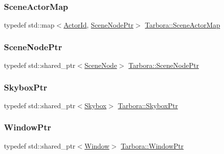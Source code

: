 \mbox{\label{namespaceTarbora_ae56af1ecaca4452fbf915c3c23354a9b}} 
\subsubsection{\texorpdfstring{Scene\+Actor\+Map}{SceneActorMap}}
{\footnotesize\ttfamily typedef std\+::map$<$\hyperlink{Global_8hpp_a2e71a876c4eb419c50f28a6c25a68ad2}{Actor\+Id}, \hyperlink{namespaceTarbora_a327c3a2ca2a7015a49e2cf0b926c47f1}{Scene\+Node\+Ptr}$>$ \hyperlink{namespaceTarbora_ae56af1ecaca4452fbf915c3c23354a9b}{Tarbora\+::\+Scene\+Actor\+Map}}

\mbox{\label{namespaceTarbora_a327c3a2ca2a7015a49e2cf0b926c47f1}} 
\subsubsection{\texorpdfstring{Scene\+Node\+Ptr}{SceneNodePtr}}
{\footnotesize\ttfamily typedef std\+::shared\+\_\+ptr$<$\hyperlink{classTarbora_1_1SceneNode}{Scene\+Node}$>$ \hyperlink{namespaceTarbora_a327c3a2ca2a7015a49e2cf0b926c47f1}{Tarbora\+::\+Scene\+Node\+Ptr}}

\mbox{\label{namespaceTarbora_aae4c8a51ae0acbb58f3e82b4a686db98}} 
\subsubsection{\texorpdfstring{Skybox\+Ptr}{SkyboxPtr}}
{\footnotesize\ttfamily typedef std\+::shared\+\_\+ptr$<$\hyperlink{classTarbora_1_1Skybox}{Skybox}$>$ \hyperlink{namespaceTarbora_aae4c8a51ae0acbb58f3e82b4a686db98}{Tarbora\+::\+Skybox\+Ptr}}

\mbox{\label{namespaceTarbora_a39d9bc5a791c73dc51bee4255997ac12}} 
\subsubsection{\texorpdfstring{Window\+Ptr}{WindowPtr}}
{\footnotesize\ttfamily typedef std\+::shared\+\_\+ptr$<$\hyperlink{classTarbora_1_1Window}{Window}$>$ \hyperlink{namespaceTarbora_a39d9bc5a791c73dc51bee4255997ac12}{Tarbora\+::\+Window\+Ptr}}



